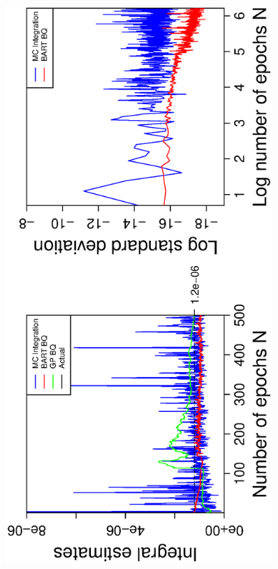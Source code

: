 \vspace{-0.5cm}
\begin{figure}[H]
  \centering
  \hspace{-1.6cm}
  \begin{minipage}[b]{0.4\textwidth}
    \includegraphics[width = 0.9\textwidth, angle = -90]{report/Figures/2/convergenceMean210Dimensions.eps}
     \vspace{-1cm}

\end{minipage}
\end{figure}
